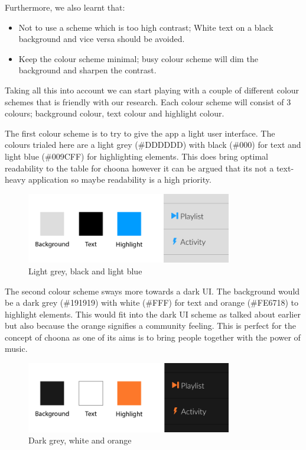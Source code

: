 \noindent Furthermore, we also learnt that:
\begin{itemize}
\item Not to use a scheme which is too high contrast; White text on a black background and vice versa should be avoided.
\item Keep the colour scheme minimal; busy colour scheme will dim the background and sharpen the contrast.
\end{itemize}

Taking all this into account we can start playing with a couple of different colour schemes that is friendly with our research. Each colour scheme will consist of 3 colours; background colour, text colour and highlight colour. 

The first colour scheme is to try to give the app a light user interface. The colours trialed here are a light grey (\#DDDDDD) with black (\#000) for text and light blue (\#009CFF) for highlighting elements. This does bring optimal readability to the table for choona however it can be argued that its not a text-heavy application so maybe readability is a high priority.\\

\begin{figure}[h!]
    \centering
        \includegraphics[width=0.8\textwidth]{./img/greybluecolours.png}
        \caption{Light grey, black and light blue}
        \label{fig:bluegrey}
\end{figure}

The second colour scheme sways more towards a dark UI. The background would be a dark grey (\#191919)  with white (\#FFF) for text and orange (\#FE6718) to highlight elements. This would fit into the dark UI scheme as talked about earlier but also because the orange signifies a community feeling. This is perfect for the concept of choona as one of its aims is to bring people together with the power of music. \\

\begin{figure}[h!]
\centering
\includegraphics[width=0.8\textwidth]{./img/greyorangecolours.png}
\caption{Dark grey, white and orange}
\label{fig:orangegrey}
\end{figure}

